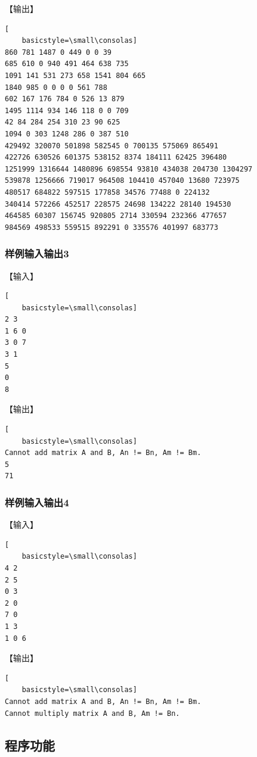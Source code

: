 \documentclass{article}
\begin{document}
【输出】

\begin{lstlisting}[
    basicstyle=\small\consolas]
860 781 1487 0 449 0 0 39 
685 610 0 940 491 464 638 735 
1091 141 531 273 658 1541 804 665 
1840 985 0 0 0 0 561 788 
602 167 176 784 0 526 13 879 
1495 1114 934 146 118 0 0 709 
42 84 284 254 310 23 90 625 
1094 0 303 1248 286 0 387 510 
429492 320070 501898 582545 0 700135 575069 865491 
422726 630526 601375 538152 8374 184111 62425 396480 
1251999 1316644 1480896 698554 93810 434038 204730 1304297 
539878 1256666 719017 964508 104410 457040 13680 723975 
480517 684822 597515 177858 34576 77488 0 224132 
340414 572266 452517 228575 24698 134222 28140 194530 
464585 60307 156745 920805 2714 330594 232366 477657 
984569 498533 559515 892291 0 335576 401997 683773
\end{lstlisting}

\subsubsection{样例输入输出3}

【输入】

\begin{lstlisting}[
    basicstyle=\small\consolas]
2 3
1 6 0
3 0 7
3 1
5
0
8
\end{lstlisting}

【输出】

\begin{lstlisting}[
    basicstyle=\small\consolas]
Cannot add matrix A and B, An != Bn, Am != Bm.
5 
71 
\end{lstlisting}

\subsubsection{样例输入输出4}

【输入】

\begin{lstlisting}[
    basicstyle=\small\consolas]
4 2
2 5
0 3
2 0
7 0
1 3
1 0 6
\end{lstlisting}

【输出】

\begin{lstlisting}[
    basicstyle=\small\consolas]
Cannot add matrix A and B, An != Bn, Am != Bm.
Cannot multiply matrix A and B, Am != Bn.
\end{lstlisting}

\subsection{程序功能}
\end{document}
